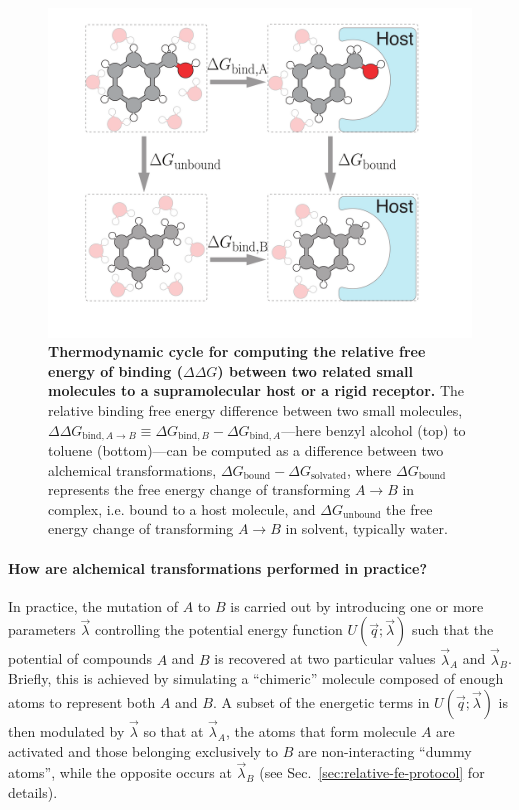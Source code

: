 \documentclass[9pt,bestpractices,pubversion]{livecoms}
\begin{document}
\begin{figure}
    \includegraphics[width=0.95\linewidth]{figures/fig2_therm_cyc/Figure.pdf}
    \caption{{\bf Thermodynamic cycle for computing the relative free energy of binding ($\Delta \Delta G$) between two related small molecules to a supramolecular host or a rigid receptor.}
    The relative binding free energy difference between two small molecules, $\Delta \Delta G_{\mathrm{bind}, A \rightarrow B} \equiv \Delta G_{\mathrm{bind}, B} - \Delta G_{\mathrm{bind}, A}$---here benzyl alcohol (top) to toluene (bottom)---can be computed as a difference between two alchemical transformations, $\Delta G_\mathrm{bound} - \Delta G_\mathrm{solvated}$, where $\Delta G_\mathrm{bound}$ represents the free energy change of transforming $A \rightarrow B$ in complex, i.e. bound to a host molecule, and $\Delta G_\mathrm{unbound}$ the free energy change of transforming $A \rightarrow B$ in solvent, typically water.}
    \label{fig:fig_binding_thermodynamic_cycle}
\end{figure}

\paragraph{How are alchemical transformations performed in practice?}

In practice, the mutation of $A$ to $B$ is carried out by introducing one or more parameters $\vec{\lambda}$ controlling the potential energy function $U(\vec{q};\vec{\lambda})$ such that the potential of compounds $A$ and $B$ is recovered at two particular values $\vec{\lambda}_A$ and $\vec{\lambda}_B$.
Briefly, this is achieved by simulating a ``chimeric'' molecule composed of enough atoms to represent both $A$ and $B$.
A subset of the energetic terms in $U(\vec{q};\vec{\lambda})$ is then modulated by $\vec{\lambda}$ so that at $\vec{\lambda}_A$, the atoms that form molecule $A$ are activated and those belonging exclusively to $B$ are non-interacting ``dummy atoms'', while the opposite occurs at $\vec{\lambda}_B$ (see Sec.~\ref{sec:relative-fe-protocol} for details).
\end{document}
